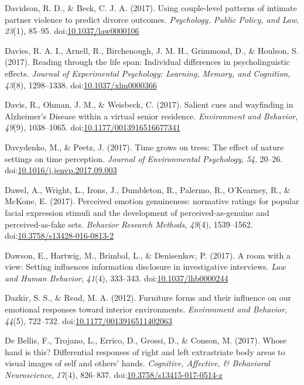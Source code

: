 \documentclass[english,man]{apa6}
\theoremstyle{definition}
\theoremstyle{definition}
\theoremstyle{definition}
\theoremstyle{remark}
\begin{document}
\hypertarget{ref-Davidson2017}{}
Davidson, R. D., \& Beck, C. J. A. (2017). Using couple-level patterns
of intimate partner violence to predict divorce outcomes.
\emph{Psychology, Public Policy, and Law}, \emph{23}(1), 85--95.
doi:\href{https://doi.org/10.1037/law0000106}{10.1037/law0000106}

\hypertarget{ref-Davies2017}{}
Davies, R. A. I., Arnell, R., Birchenough, J. M. H., Grimmond, D., \&
Houlson, S. (2017). Reading through the life span: Individual
differences in psycholinguistic effects. \emph{Journal of Experimental
Psychology: Learning, Memory, and Cognition}, \emph{43}(8), 1298--1338.
doi:\href{https://doi.org/10.1037/xlm0000366}{10.1037/xlm0000366}

\hypertarget{ref-Davis2017}{}
Davis, R., Ohman, J. M., \& Weisbeck, C. (2017). Salient cues and
wayfinding in Alzheimer's Disease within a virtual senior residence.
\emph{Environment and Behavior}, \emph{49}(9), 1038--1065.
doi:\href{https://doi.org/10.1177/0013916516677341}{10.1177/0013916516677341}

\hypertarget{ref-Davydenko2017}{}
Davydenko, M., \& Peetz, J. (2017). Time grows on trees: The effect of
nature settings on time perception. \emph{Journal of Environmental
Psychology}, \emph{54}, 20--26.
doi:\href{https://doi.org/10.1016/j.jenvp.2017.09.003}{10.1016/j.jenvp.2017.09.003}

\hypertarget{ref-Dawel2017}{}
Dawel, A., Wright, L., Irons, J., Dumbleton, R., Palermo, R., O'Kearney,
R., \& McKone, E. (2017). Perceived emotion genuineness: normative
ratings for popular facial expression stimuli and the development of
perceived-as-genuine and perceived-as-fake sets. \emph{Behavior Research
Methods}, \emph{49}(4), 1539--1562.
doi:\href{https://doi.org/10.3758/s13428-016-0813-2}{10.3758/s13428-016-0813-2}

\hypertarget{ref-Dawson2017}{}
Dawson, E., Hartwig, M., Brimbal, L., \& Denisenkov, P. (2017). A room
with a view: Setting influences information disclosure in investigative
interviews. \emph{Law and Human Behavior}, \emph{41}(4), 333--343.
doi:\href{https://doi.org/10.1037/lhb0000244}{10.1037/lhb0000244}

\hypertarget{ref-Dazkir2012}{}
Dazkir, S. S., \& Read, M. A. (2012). Furniture forms and their
influence on our emotional responses toward interior environments.
\emph{Environment and Behavior}, \emph{44}(5), 722--732.
doi:\href{https://doi.org/10.1177/0013916511402063}{10.1177/0013916511402063}

\hypertarget{ref-DeBellis2017}{}
De Bellis, F., Trojano, L., Errico, D., Grossi, D., \& Conson, M.
(2017). Whose hand is this? Differential responses of right and left
extrastriate body areas to visual images of self and others' hands.
\emph{Cognitive, Affective, \& Behavioral Neuroscience}, \emph{17}(4),
826--837.
doi:\href{https://doi.org/10.3758/s13415-017-0514-z}{10.3758/s13415-017-0514-z}
\end{document}

